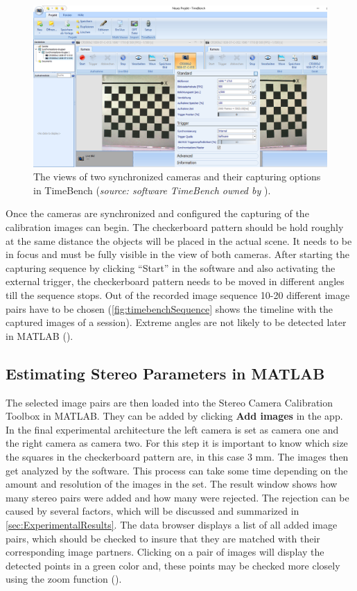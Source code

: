 \begin{figure}[htbp]
		\centering
		\includegraphics[width=1.0\textwidth]{figures/timebenchRecord}
		\caption[The views of two synchronized cameras and their capturing options in TimeBench]{The views of two synchronized cameras and their capturing options in TimeBench (\textit{source: software TimeBench owned by} \cite{Optronis.2016}).}
		\label{fig:timebanchRecord}
\end{figure}

Once the cameras are synchronized and configured the capturing of the calibration images can begin. The checkerboard pattern should be hold roughly at the same distance the objects will be placed in the actual scene. It needs to be in focus and must be fully visible in the view of both cameras. After starting the capturing sequence by clicking \enquote{Start} in the software and also activating the external trigger, the checkerboard pattern needs to be moved in different angles till the sequence stops. Out of the recorded image sequence 10-20 different image pairs have to be chosen (\autoref{fig:timebenchSequence} shows the timeline with the captured images of a session). Extreme angles are not likely to be detected later in MATLAB (\cite{StereoCalib.2016}).

\subsection{Estimating Stereo Parameters in MATLAB}\label{ssec:estimateStereoParams}
The selected image pairs are then loaded into the Stereo Camera Calibration Toolbox in MATLAB. They can be added by clicking \textbf{Add images} in the app. In the final experimental architecture the left camera is set as camera one and the right camera as camera two. For this step it is important to know which size the squares in the checkerboard pattern are, in this case 3 mm. The images then get analyzed by the software. This process can take some time depending on the amount and resolution of the images in the set. The result window shows how many stereo pairs were added and how many were rejected. The rejection can be caused by several factors, which will be discussed and summarized in \autoref{sec:ExperimentalResults}. The data browser displays a list of all added image pairs, which should be checked to insure that they are matched with their corresponding image partners. Clicking on a pair of images will display the detected points in a green color and, these points may be checked more closely using the zoom function (\cite{StereoCalib.2016}).

